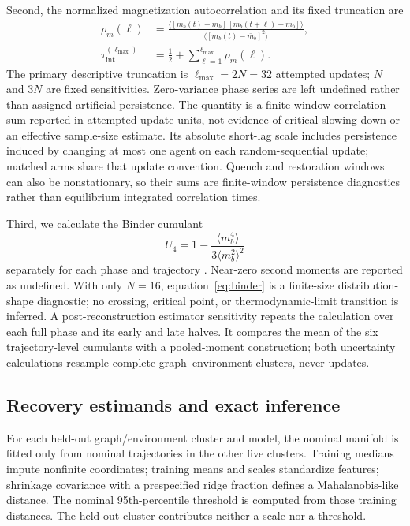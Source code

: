 \documentclass[12pt]{article}
\begin{document}
Second, the normalized magnetization autocorrelation and its fixed truncation
are
\begin{align}
\rho_m(\ell)&=\frac{\langle[m_b(t)-\bar m_b]
\,[m_b(t+\ell)-\bar m_b]\rangle}
{\langle[m_b(t)-\bar m_b]^2\rangle},\nonumber\\
\tau_{\mathrm{int}}^{(\ell_{\max})}&=\frac{1}{2}+
\sum_{\ell=1}^{\ell_{\max}}\rho_m(\ell).
\label{eq:autocorrelation}
\end{align}
The primary descriptive truncation is $\ell_{\max}=2N=32$ attempted updates;
$N$ and $3N$ are fixed sensitivities.  Zero-variance phase series are left
undefined rather than assigned artificial persistence.  The quantity is a
finite-window correlation sum reported in attempted-update units, not evidence
of critical slowing down or an effective sample-size estimate.  Its absolute
short-lag scale includes persistence induced by changing at most one agent on
each random-sequential update; matched arms share that update convention.
Quench and restoration windows can also be nonstationary, so their sums are
finite-window persistence diagnostics rather than equilibrium integrated
correlation times.

Third, we calculate the Binder cumulant
\begin{equation}
U_4=1-\frac{\langle m_b^4\rangle}
{3\langle m_b^2\rangle^2}
\label{eq:binder}
\end{equation}
separately for each phase and trajectory \cite{binder1981}.  Near-zero second moments are
reported as undefined.  With only $N=16$, equation~\eqref{eq:binder} is a
finite-size distribution-shape diagnostic; no crossing, critical point, or
thermodynamic-limit transition is inferred.  A post-reconstruction estimator
sensitivity repeats the calculation over each full phase and its early and
late halves.  It compares the mean of the six trajectory-level cumulants with
a pooled-moment construction; both uncertainty calculations resample complete
graph--environment clusters, never updates.

\subsection{Recovery estimands and exact inference}
\label{sec:inferential-design}

For each held-out graph/environment cluster and model, the nominal manifold is
fitted only from nominal trajectories in the other five clusters.  Training
medians impute nonfinite coordinates; training means and scales standardize
features; shrinkage covariance with a prespecified ridge fraction defines a
Mahalanobis-like distance.  The nominal 95th-percentile threshold is computed
from those training distances.  The held-out cluster contributes neither a
scale nor a threshold.
\end{document}

